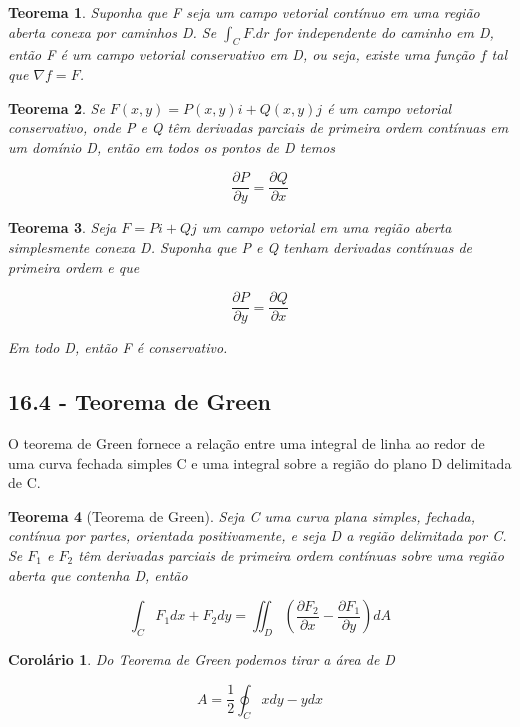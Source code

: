 \documentclass[12pt]{article}
\newtheorem{theorem}{Teorema}[section]
\newtheorem{corollary}{Corolário}[theorem]
\begin{document}
\begin{theorem}
    Suponha que F seja um campo vetorial contínuo em uma região aberta conexa por caminhos D. Se $\int_C F . dr$ for independente do caminho em D, então F é um campo vetorial conservativo em D, ou seja, existe uma função $f$ tal que $\nabla f = F$.
\end{theorem}

\begin{theorem}
    Se $F(x, y) = P(x, y)i + Q(x, y)j$ é um campo vetorial conservativo, onde P e Q têm derivadas parciais de primeira ordem contínuas em um domínio D, então em todos os pontos de D temos

    $$\frac{\partial P}{\partial y} = \frac{\partial Q}{\partial x}$$
\end{theorem}

\begin{theorem}
    Seja $F = Pi + Qj$ um campo vetorial em uma região aberta simplesmente conexa D. Suponha que P e Q tenham derivadas contínuas de primeira ordem e que

    $$\frac{\partial P}{\partial y} = \frac{\partial Q}{\partial x}$$

    Em todo D, então F é conservativo.
\end{theorem}

\subsection*{16.4 - Teorema de Green}
\label{s5}

O teorema de Green fornece a relação entre uma integral de linha ao redor de uma curva fechada simples C e uma integral sobre a região do plano D delimitada de C.

\begin{theorem}[Teorema de Green]
    Seja C uma curva plana simples, fechada, contínua por partes, orientada positivamente, e seja D a região delimitada por C. Se $F_1$ e $F_2$ têm derivadas parciais de primeira ordem contínuas sobre uma região aberta que contenha D, então
    
    $$\int_{C} F_1 d x + F_2 d y = \iint_D \left( \dfrac{\partial F_2}{\partial x} - \dfrac{\partial F_1}{\partial y} \right) d A$$
\end{theorem}

\begin{corollary}
    Do Teorema de Green podemos tirar a área de D
    
    $$A = \dfrac{1}{2} \oint_C x d y - y d x$$
\end{corollary}
\end{document}
